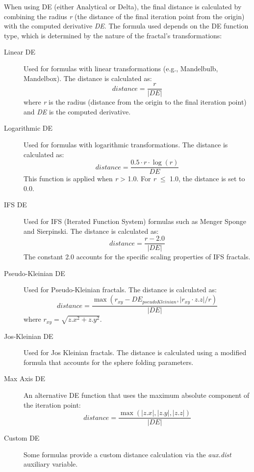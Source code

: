 When using DE (either Analytical or Delta), the final distance is calculated by combining the radius \emph{r} (the distance of the final iteration point from the origin) with the computed derivative \emph{DE}. The formula used depends on the DE function type, which is determined by the nature of the fractal's transformations:

\begin{description}
	\item[Linear DE] Used for formulas with linear transformations (e.g., Mandelbulb, Mandelbox). The distance is calculated as:
	\[ distance = \frac{r}{\lvert DE \rvert} \]
	where \emph{r} is the radius (distance from the origin to the final iteration point) and \emph{DE} is the computed derivative.
	
	\item[Logarithmic DE] Used for formulas with logarithmic transformations. The distance is calculated as:
	\[ distance = \frac{0.5 \cdot r \cdot \log(r)}{DE} \]
	This function is applied when \emph{r} > 1.0. For \emph{r} $\le$ 1.0, the distance is set to 0.0.
	
	\item[IFS DE] Used for IFS (Iterated Function System) formulas such as Menger Sponge and Sierpinski. The distance is calculated as:
	\[ distance = \frac{r - 2.0}{\lvert DE \rvert} \]
	The constant 2.0 accounts for the specific scaling properties of IFS fractals.
	
	\item[Pseudo-Kleinian DE] Used for Pseudo-Kleinian fractals. The distance is calculated as:
	\[ distance = \frac{\max(r_{xy} - DE_{pseudoKleinian}, \lvert r_{xy} \cdot z.z \rvert / r)}{\lvert DE \rvert} \]
	where $r_{xy} = \sqrt{z.x^2 + z.y^2}$.
	
	\item[Jos-Kleinian DE] Used for Jos Kleinian fractals. The distance is calculated using a modified formula that accounts for the sphere folding parameters.
	
	\item[Max Axis DE] An alternative DE function that uses the maximum absolute component of the iteration point:
	\[ distance = \frac{\max(\lvert z.x \rvert, \lvert z.y \rvert, \lvert z.z \rvert)}{\lvert DE \rvert} \]
	
	\item[Custom DE] Some formulas provide a custom distance calculation via the \emph{aux.dist} auxiliary variable.
\end{description}

